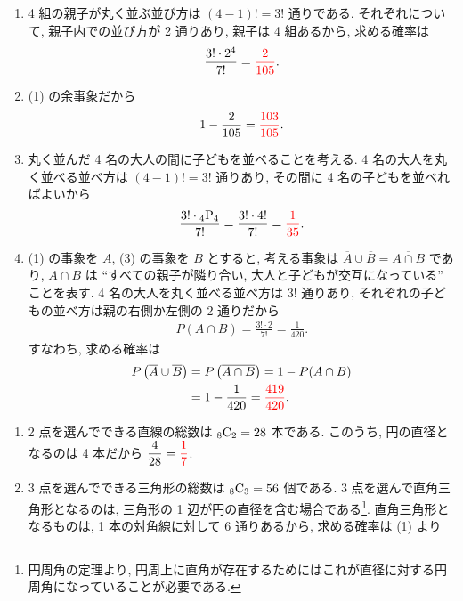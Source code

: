 \begin{qenumerate}
{\begin{enumerate}
			\item{
				4 組の親子が丸く並ぶ並び方は $(4 - 1)! = 3!$ 通りである.
				それぞれについて, 親子内での並び方が 2 通りあり, 親子は 4 組あるから, 求める確率は
				\begin{align}
					\frac{3!\cdot 2^{4}}{7!} = \textcolor{red}{\frac{2}{105}}.
				\end{align}
			}
			\item{
				(1) の余事象だから
				\begin{align}
					1 - \frac{2}{105} = \textcolor{red}{\frac{103}{105}}.
				\end{align}
			}
			\item{
				丸く並んだ 4 名の大人の間に子どもを並べることを考える.
				4 名の大人を丸く並べる並べ方は $(4 - 1)! = 3!$ 通りあり, その間に 4 名の子どもを並べればよいから
				\begin{align}
					\frac{3!\cdot {{}_{4}\mathrm{P}_{4}}}{7!} = \frac{3!\cdot 4!}{7!} = \textcolor{red}{\frac{1}{35}}.
				\end{align}
			}
			\item{
				(1) の事象を $A$, (3) の事象を $B$ とすると, 考える事象は $\overline{A}\cup\overline{B} = \overline{A\cap B}$ であり, $A\cap B$ は ``すべての親子が隣り合い, 大人と子どもが交互になっている'' ことを表す.
				4 名の大人を丸く並べる並べ方は $3!$ 通りあり, それぞれの子どもの並べ方は親の右側か左側の 2 通りだから
				\begin{align}
					P(A\cap B) = \frac{3!\cdot 2}{7!} = \frac{1}{420}.
				\end{align}
				すなわち, 求める確率は
				\begin{align}
					P\left(\overline{A}\cup \overline{B}\right) &= P\left(\overline{A\cap B}\right) = 1 - P(A\cap B) \\
						&= 1 - \frac{1}{420} = \textcolor{red}{\frac{419}{420}}.
				\end{align}
			}
		\end{enumerate}
	}
	\item{
		\begin{enumerate}
			\item{
				2 点を選んでできる直線の総数は ${{}_{8}\mathrm{C}_{2}} = 28$ 本である.
				このうち, 円の直径となるのは 4 本だから $\dfrac{4}{28} = \textcolor{red}{\dfrac{1}{7}}$.
			}
			\item{
				3 点を選んでできる三角形の総数は ${{}_{8}\mathrm{C}_{3}} = 56$ 個である.
				3 点を選んで直角三角形となるのは, 三角形の 1 辺が円の直径を含む場合である\footnote{円周角の定理より, 円周上に直角が存在するためにはこれが直径に対する円周角になっていることが必要である.}.
				直角三角形となるものは, 1 本の対角線に対して 6 通りあるから, 求める確率は (1) より
}
\end{enumerate}}
\end{qenumerate}
